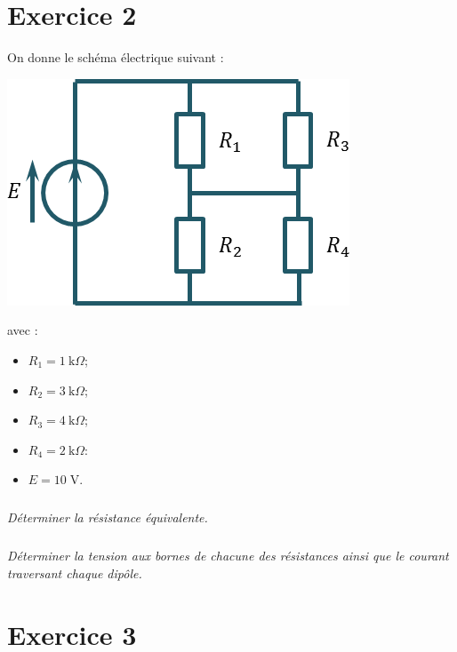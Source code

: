 \documentclass[10pt,fleqn]{book} %
\begin{document}
\begin{multicols}{2}
\section*{Exercice 2}

\setcounter{subparagraph}{0}
On donne le schéma électrique suivant :
\begin{center}
\includegraphics[width=.9\linewidth]{images/fig_03}
\end{center}

avec : 
\begin{multicols}{2}
\begin{itemize}
\item $R_1 = 1 \: \text{k}\Omega$;
\item $R_2 = 3 \: \text{k}\Omega$;
\item $R_3 = 4 \: \text{k}\Omega$;
\item $R_4 = 2 \: \text{k}\Omega$:
\item $E=10 \; \text{V}$.
\end{itemize}
\end{multicols}

\subparagraph{}
\textit{Déterminer la résistance équivalente.}

\subparagraph{}
\textit{Déterminer la tension aux bornes de chacune des résistances ainsi que le courant traversant chaque dipôle.}


\section*{Exercice 3}


\end{multicols}
\end{document}
